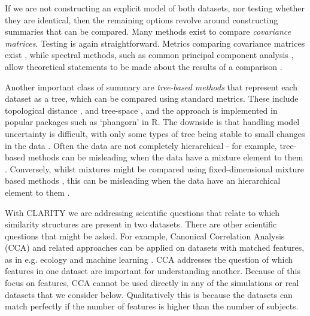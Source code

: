 \documentclass[a4]{article}
\newcommand{\+}[1]{\mathbf{#1}}
\begin{document}
If we are not constructing an explicit model of both datasets, nor testing whether they are identical, then the remaining options revolve around constructing summaries that can be compared. Many methods exist to compare \emph{covariance matrices}. Testing \cite{SteigerTestscomparingelements1980} is again straightforward. Metrics comparing covariance matrices exist \cite{ForstnerMetricCovarianceMatrices2003}, while spectral methods, such as common principal component analysis \cite{FluryCommonPrincipalComponents1988}, allow theoretical statements to be made about the results of a comparison \cite{FluryAsymptoticTheoryCommon1986}.

Another important class of summary are \emph{tree-based methods} that represent each dataset as a tree, which can be compared using standard metrics. These include topological distance \cite{PennyUseTreeComparison1985,Billesurveytreeedit2005}, and tree-space \cite{NyePrincipalcomponentanalysis2017}, and the approach is implemented in popular packages such as `phangorn' \cite{Schliepphangornphylogeneticanalysis2011} in R. The downside is that handling model uncertainty is difficult, with only some types of tree being stable to small changes in the data \cite{carlsson_characterization_2010}. Often the data are not completely hierarchical - for example, tree-based methods can be misleading when the data have a mixture element to them \cite{mossel_phylogenetic_2005}. Conversely, whilst mixtures might be compared using fixed-dimensional mixture based methods \cite{TippingDerivingclusteranalytic1999,MahalanabisApproximatingdistancesmixture2009}, this can be misleading when the data have an hierarchical element to them \cite{lawson2018tutorial}.

With CLARITY we are addressing scientific questions that relate to which similarity structures are present in two datasets. There are other scientific questions that might be asked. For example, Canonical Correlation Analysis (CCA) \cite{hotelling1936relations, seber2009multivariate} and related approaches can be applied on datasets with matched features, as in e.g. ecology \cite{ter1987analysis} and machine learning \cite{hardoon2004canonical, NIPS2017_7188}. CCA addresses the question of which features in one dataset are important for understanding another. Because of this focus on features, CCA cannot be used directly in any of the simulations or real datasets that we consider below. Qualitatively this is because the datasets can match perfectly if the number of features is higher than the number of subjects. 
\end{document}
